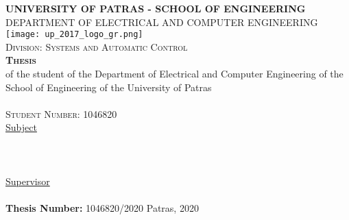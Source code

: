 \begin{titlepage}
\begin{center}
\textsc{\textbf{\large UNIVERSITY OF PATRAS - SCHOOL OF ENGINEERING}\\
\large DEPARTMENT OF ELECTRICAL AND COMPUTER ENGINEERING}\\

\texttt{[image: up\_2017\_logo\_gr.png]}\\  

\textsc{Division: \large Systems and Automatic Control}\\[1cm]

\textsc{\textbf{\LARGE{Thesis}}}\\ [0.5cm]
of the student of the Department of Electrical and Computer Engineering of the School of Engineering of the University of Patras\\[0.5cm]

\textsc{\Large \me }\\[0.5cm]
\textsc{\large Student Number: 1046820}\\[1cm]

\underline{\large Subject}\\
\HRule \\[0.4cm]
{\huge \bfseries \thesistitle }\\[0.4cm] %
\HRule \\[1.5cm]

\underline{\large Supervisor}\\[0.5cm]
\large \suptitle \, \supname \\[1cm]
\textbf{Thesis Number:}
\large 1046820/2020
\vfill
\large{Patras, 2020}
\end{center}
\end{titlepage}





